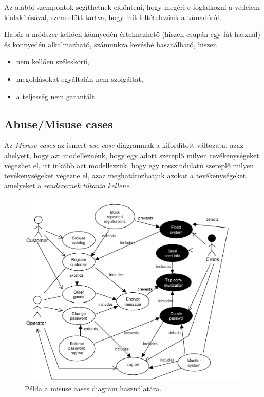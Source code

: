 Az alábbi szempontok segíthetnek eldönteni, hogy megéri-e foglalkozni a védelem kialakításával,
szem előtt tartva, hogy mit feltételezünk a támadóról.

Habár a módszer kellően könnyedén értelmezhető (hiszen csupán egy fát használ) és könnyedén
alkalmazható, számunkra kevésbé használható, hiszen
\begin{itemize}
    \item{nem kellően széleskörű,}
    \item{megoldásokat egyáltalán nem szolgáltat,}
    \item{a teljesség nem garantált.}
\end{itemize}

\FloatBarrier
\subsection{Abuse/Misuse cases}

Az \emph{Misuse cases}\cite{alexander2003misuse} az ismert \emph{use case} diagramnak a kifordított
változata, azaz ahelyett, hogy azt modelleznénk, hogy egy adott szereplő milyen tevékenységeket
végezhet el, itt inkább azt modellezzük, hogy egy rosszindulatú szereplő milyen tevékenységeket
végezne el, azaz meghatározhatjuk azokat a tevékenységeket, amelyeket a \emph{rendszernek tiltania
kellene}.

\begin{figure}[h]
    \centering
    \includegraphics[width=\textwidth, height=0.5\textheight, keepaspectratio]{figures/misusecase.png}
    \caption{Példa a misuse cases diagram használatára.}
\end{figure}

